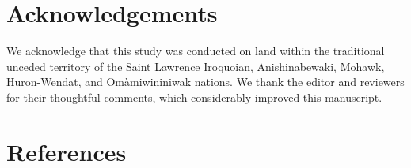 \documentclass[10pt,oneside]{article}
\begin{document}
\hypertarget{acknowledgements}{%
\section{Acknowledgements}\label{acknowledgements}}

We acknowledge that this study was conducted on land within the
traditional unceded territory of the Saint Lawrence Iroquoian,
Anishinabewaki, Mohawk, Huron-Wendat, and Omàmiwininiwak nations. We
thank the editor and reviewers for their thoughtful comments, which
considerably improved this manuscript.

\hypertarget{references}{%
\section*{References}\label{references}}
\end{document}
